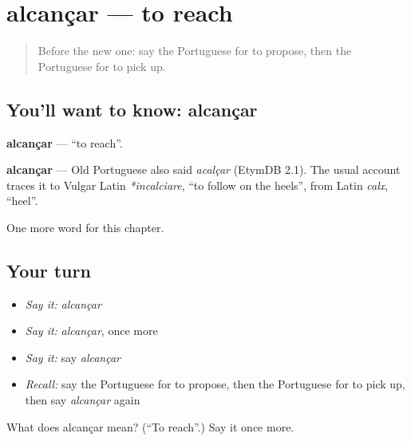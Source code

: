 \section[alcançar]{alcançar — to reach}

\label{lesson:PT-C143-alcancar}



\begin{quote}
Before the new one: say the Portuguese for to propose, then the Portuguese for to pick up.
\end{quote}

\subsection*{You'll want to know: alcançar}
\textbf{alcançar} — \textquotedblleft{}to reach\textquotedblright{}.

\begin{cousinweb}
\textbf{alcançar} — Old Portuguese also said \emph{acalçar} (EtymDB 2.1). The usual account traces it to Vulgar Latin \emph{*incalciare}, \textquotedblleft{}to follow on the heels\textquotedblright{}, from Latin \emph{calx}, \textquotedblleft{}heel\textquotedblright{}.
\end{cousinweb}

\begin{grammarlens}[title={What you've built}]
One more word for this chapter.
\end{grammarlens}

\subsection*{Your turn}
\begin{itemize}
\raggedright
  \item \emph{Say it:} \emph{alcançar}
  \item \emph{Say it:} \emph{alcançar}, once more
  \item \emph{Say it:} say \emph{alcançar}
  \item \emph{Recall:} say the Portuguese for to propose, then the Portuguese for to pick up, then say \emph{alcançar} again
\end{itemize}

\begin{tcolorbox}[breakable,colback=teal!4,colframe=teal!35!black,title={Before you move on}]
What does alcançar mean? (\textquotedblleft{}To reach\textquotedblright{}.) Say it once more.
\end{tcolorbox}
